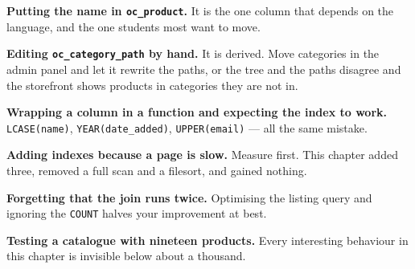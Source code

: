 \begin{pitfall}
\begin{tight}
  \item \textbf{Putting the name in \texttt{oc\_product}.} It is the one column
        that depends on the language, and the one students most want to move.
  \item \textbf{Editing \texttt{oc\_category\_path} by hand.} It is derived.
        Move categories in the admin panel and let it rewrite the paths, or the
        tree and the paths disagree and the storefront shows products in
        categories they are not in.
  \item \textbf{Wrapping a column in a function and expecting the index to
        work.} \texttt{LCASE(name)}, \texttt{YEAR(date\_added)},
        \texttt{UPPER(email)} --- all the same mistake.
  \item \textbf{Adding indexes because a page is slow.} Measure first. This
        chapter added three, removed a full scan and a filesort, and gained
        nothing.
  \item \textbf{Forgetting that the join runs twice.} Optimising the listing
        query and ignoring the \texttt{COUNT} halves your improvement at best.
  \item \textbf{Testing a catalogue with nineteen products.} Every interesting
        behaviour in this chapter is invisible below about a thousand.
\end{tight}
\end{pitfall}

